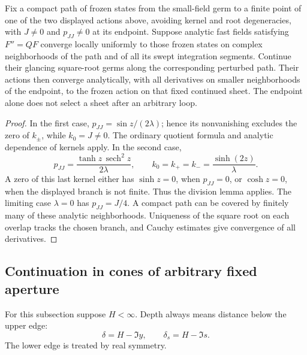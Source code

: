 \begin{lemma}\label{cone:profile-action-convergence}
Fix a compact path of frozen states from the small-field germ to a
finite point of one of the two displayed actions above, avoiding kernel
and root degeneracies, with \(J\ne0\) and \(p_{JJ}\ne0\) at its endpoint.
Suppose analytic fast fields satisfying \(F''=QF\) converge locally
uniformly to those frozen states on complex neighborhoods of the path
and of all its swept integration segments. Continue their glancing
square-root germs along
the corresponding perturbed path. Their actions then converge
analytically, with all derivatives on smaller neighborhoods of the
endpoint, to the frozen action on that fixed continued sheet. The
endpoint alone does not select a sheet after an arbitrary loop.
\end{lemma}

\begin{proof}
In the first case,
\(p_{JJ}=\sin z/(2\lambda)\); hence its nonvanishing excludes the zero of
\(k_\pm\), while \(k_0=J\ne0\). The ordinary quotient formula and
analytic dependence of kernels apply. In the second case,
\[
 p_{JJ}=\frac{\tanh z\,\operatorname{sech}^2z}{2\lambda},\qquad
 k_0=k_+=k_-=\frac{\sinh(2z)}{\lambda}.
\]
A zero of this last kernel either has \(\sinh z=0\), when
\(p_{JJ}=0\), or \(\cosh z=0\), when the displayed branch is not finite.
Thus the division lemma applies. The limiting case \(\lambda=0\) has
\(p_{JJ}=J/4\). A compact path can be covered by finitely many of these
analytic neighborhoods. Uniqueness of the square root on each overlap
tracks the chosen branch, and Cauchy estimates give convergence of all
derivatives.
\end{proof}

\subsection{Continuation in cones of arbitrary fixed aperture}

For this subsection suppose \(H<\infty\). Depth always means distance
below the upper edge:
\[
 \delta=H-\Im y,\qquad \delta_s=H-\Im s.
\]
The lower edge is treated by real symmetry.

